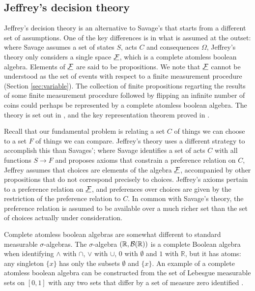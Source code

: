 \subsection{Jeffrey's decision theory}

Jeffrey's decision theory is an alternative to Savage's that starts from a different set of assumptions. One of the key differences is in what is assumed at the outset: where Savage assumes a set of states $S$, acts $C$ and consequences $\Omega$, Jeffrey's theory only considers a single space $\underline{\mathcal{F}}$, which is a complete atomless boolean algebra. Elements of $\underline{\mathcal{F}}$ are said to be propositions. We note that $\underline{\mathcal{F}}$ cannot be understood as the set of events with respect to a finite measurement procedure (Section \ref{sec:variable}). The collection of finite propositions regarting the results of some finite measurement procedure followed by flipping an infinite number of coins could perhaps be represented by a complete atomless boolean algebra. The theory is set out in \citet{jeffrey_logic_1990}, and the key representation theorem proved in \citet{bolker_functions_1966}.

Recall that our fundamental problem is relating a set $C$ of things we can choose to a set $F$ of things we can compare. Jeffrey's theory uses a different strategy to accomplish this than Savages'; where Savage identifies a set of acts $C$ with all functions $S\to F$ and proposes axioms that constrain a preference relation on $C$, Jeffrey assumes that choices are elements of the algebra $\underline{\mathcal{F}}$, accompanied by other propositions that do not correspond precisely to choices. Jeffrey's axioms pertain to a preference relation on $\underline{\mathcal{F}}$, and preferences over choices are given by the restriction of the preference relation to $C$. In common with Savage's theory, the preference relation is assumed to be available over a much richer set than the set of choices actually under consideration.

Complete atomless boolean algebras are somewhat different to standard measurable $\sigma$-algebras. The $\sigma$-algebra $(\mathbb{R},\mathcal{B}(\mathbb{R}))$ is a complete Boolean algebra when identifying $\land$ with $\cap$, $\lor$ with $\cup$, $0$ with $\emptyset$ and $1$ with $\mathbb{R}$, but it has atoms: any singleton $\{x\}$ has only the subsets $\emptyset$ and $\{x\}$. An example of a complete atomless boolean algebra can be constructed from the set of Lebesgue measurable sets on $[0,1]$ with any two sets that differ by a set of measure zero identified \citet{bolker_simultaneous_1967}.

